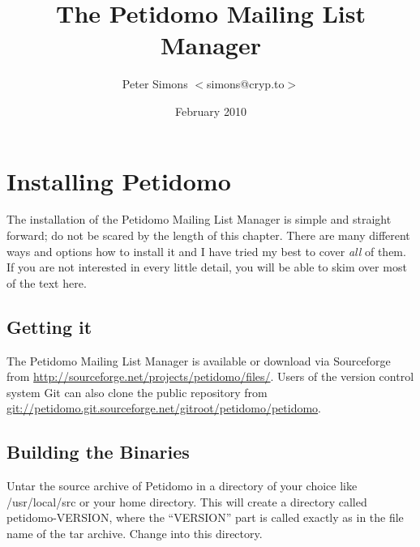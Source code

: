 \documentclass[a4paper,11pt]{scrreprt}
\newcommand{\file}[1]{{\sf #1}}
\begin{document}
\title{The Petidomo Mailing List Manager}
\author{Peter Simons $<$simons@cryp.to$>$}
\date{February 2010}
\maketitle
\tableofcontents
\clearpage

\chapter{Installing Petidomo}

The installation of the Petidomo Mailing List Manager is simple and
straight forward; do not be scared by the length of this chapter.
There are many different ways and options how to install it and I have
tried my best to cover \emph{all} of them. If you are not interested
in every little detail, you will be able to skim over most of the text
here.

\section{Getting it}

The Petidomo Mailing List Manager is available or download via
Sourceforge from \url{http://sourceforge.net/projects/petidomo/files/}.
Users of the version control system Git can also clone the public
repository from
\url{git://petidomo.git.sourceforge.net/gitroot/petidomo/petidomo}.

\section{Building the Binaries}

Untar the source archive of Petidomo in a directory of your choice
like \file{/usr/local/src} or your home directory. This will create a
directory called \file{petidomo-VERSION}, where the ``VERSION''
part is called exactly as in the file name of the tar archive. Change
into this directory.
\end{document}
